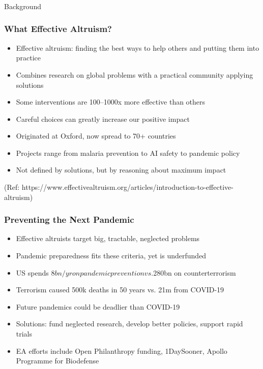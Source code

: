 \begin{frame}[fragile]\frametitle{}
\begin{center}
{\Large Background}
\end{center}
\end{frame}

\begin{frame}[fragile]\frametitle{What Effective Altruism?}
      \begin{itemize}
        \item Effective altruism: finding the best ways to help others and putting them into practice
        \item Combines research on global problems with a practical community applying solutions
        \item Some interventions are 100–1000x more effective than others
        \item Careful choices can greatly increase our positive impact
        \item Originated at Oxford, now spread to 70+ countries
        \item Projects range from malaria prevention to AI safety to pandemic policy
        \item Not defined by solutions, but by reasoning about maximum impact
      \end{itemize}
	  
{\tiny (Ref: https://www.effectivealtruism.org/articles/introduction-to-effective-altruism)}  	  
  
\end{frame}

\begin{frame}[fragile]\frametitle{Preventing the Next Pandemic}
      \begin{itemize}
        \item Effective altruists target big, tractable, neglected problems
        \item Pandemic preparedness fits these criteria, yet is underfunded
        \item US spends $8bn/yr on pandemic prevention vs. $280bn on counterterrorism
        \item Terrorism caused 500k deaths in 50 years vs. 21m from COVID-19
        \item Future pandemics could be deadlier than COVID-19
        \item Solutions: fund neglected research, develop better policies, support rapid trials
        \item EA efforts include Open Philanthropy funding, 1DaySooner, Apollo Programme for Biodefense
      \end{itemize}
\end{frame}

